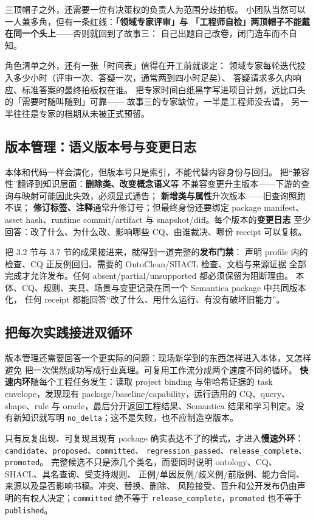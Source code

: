 三顶帽子之外，还需要一位有决策权的负责人为范围分歧拍板。
小团队当然可以一人兼多角，但有一条红线：\textbf{「领域专家评审」与
「工程师自检」两顶帽子不能戴在同一个头上}——否则就回到了故事三：
自己出题自己改卷，闭门造车而不自知。

角色清单之外，还有一张「时间表」值得在开工前就谈定：
领域专家每轮迭代投入多少小时（评审一次、答疑一次，通常两到四小时足矣）、
答疑请求多久内响应、标准答案的最终拍板权在谁。
把专家时间白纸黑字写进项目计划，远比口头的「需要时随叫随到」可靠——
故事三的专家缺位，一半是工程师没去请，
另一半往往是专家的档期从未被正式预留。

\subsection{版本管理：语义版本号与变更日志}

本体和代码一样会演化，但版本号只是索引，不能代替内容身份与回归。
把“兼容性”翻译到知识层面：\textbf{删除类、改变概念语义}等
不兼容变更升主版本——下游的查询与映射可能因此失效，必须显式通告；
\textbf{新增类与属性}升次版本——旧查询照跑不误；
\textbf{修订标签、注释}通常升修订号；但最终身份还要绑定 package manifest、
asset hash、runtime commit/artifact 与 snapshot/diff。每个版本的\textbf{变更日志}
至少回答：改了什么、为什么改、影响哪些 CQ、由谁裁决、哪份 receipt 可以复核。

把 3.2 节与 3.7 节的成果接进来，就得到一道完整的\textbf{发布门禁}：
声明 profile 内的检查、CQ 正反例回归、需要的 OntoClean/SHACL 检查、文档与来源证据
全部完成才允许发布。任何 absent/partial/unsupported 都必须保留为阻断理由。
本体、CQ、规则、夹具、场景与变更记录在同一个 Semantica package 中共同版本化，
任何 receipt 都能回答“改了什么、用什么运行、有没有破坏旧能力”。

\subsection{把每次实践接进双循环}

版本管理还需要回答一个更实际的问题：现场新学到的东西怎样进入本体，又怎样避免
把一次偶然成功写成行业真理。可复用工作流分成两个速度不同的循环。
\textbf{快速内环}随每个工程任务发生：读取 project binding 与带哈希证据的 task
envelope，发现现有 package/baseline/capability，运行适用的 CQ、query、shape、rule
与 oracle，最后分开返回工程结果、Semantica 结果和学习判定。没有新知识就写明
\texttt{no\_delta}；这不是失败，也不应制造空版本。

只有反复出现、可复现且现有 package 确实表达不了的模式，才进入\textbf{慢速外环}：
\texttt{candidate}、\texttt{proposed}、\texttt{committed}、
\texttt{regression\_passed}、\texttt{release\_complete}、\texttt{promoted}。
完整候选不只是添几个类名，而要同时说明 ontology、CQ、SHACL、具名查询、受支持规则、
正例/单因反例/歧义例/前版例、能力合同、来源以及是否影响书稿。冲突、替换、删除、
风险接受、晋升和公开发布仍由声明的有权人决定；\texttt{committed} 绝不等于
\texttt{release\_complete}，\texttt{promoted} 也不等于 \texttt{published}。

